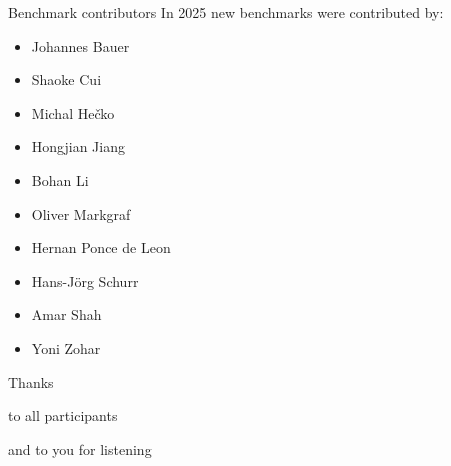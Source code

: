 \documentclass[table]{beamer}
\def\emph#1{\textcolor{MYblue}{#1}}
\begin{document}
\begin{frame}[shrink=0.95]{Benchmark contributors}
  In 2025 \emph{new benchmarks} were contributed by:

  \small
  \begin{itemize}
    \item Johannes Bauer
    \item Shaoke Cui
    \item Michal Hečko
    \item Hongjian Jiang
    \item Bohan Li
    \item Oliver Markgraf
    \item Hernan Ponce de Leon
    \item Hans-Jörg Schurr
    \item Amar Shah
    \item Yoni Zohar
  \end{itemize}
\end{frame}

\begin{frame}

  \begin{center}
    \Large\emph{Thanks}
  \end{center}

  \begin{center}
    to all participants
  \end{center}

  \bigskip
  \pause


  \begin{center}
    and to you for listening
  \end{center}

\end{frame}
\end{document}

